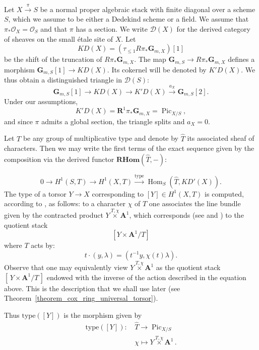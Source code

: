 \documentclass{proc-l}
\newcommand{\R}{\mathbf{R}}
\newcommand{\G}{\mathbf{G}}
\DeclareMathOperator{\Pic}{Pic}
\DeclareMathOperator{\Hom}{Hom}
\newcommand{\affine}{\mathbf{A}}
\newcommand{\sheafO}{\mathcal{O}}
\theoremstyle{definition}
\theoremstyle{remark}
\numberwithin{equation}{section}
\begin{document}
Let $X \xrightarrow{\pi} S$ be a normal proper algebraic stack with finite diagonal over a scheme $S$, which we assume to be either a Dedekind scheme or a field. We assume that $\pi_* \sheafO_X = \sheafO_S$ and that $\pi$ has a section. We write $\mathcal{D}(X)$ for the derived category of sheaves on the small étale site of $X$. Let
$$K D(X) = (\tau_{\leqslant 1} R \pi_* \G_{m,X} )[1]$$
be the shift of the truncation of $R\pi_* \G_{m,X}$. The map $\G_{m,S} \rightarrow R\pi_* \G_{m,X}$ defines a morphism $\G_{m,S}[1] \rightarrow K D(X)$. Its cokernel will be denoted by $K'D(X)$. We thus obtain a distinguished triangle in $\mathcal{D}(S)$:
$$\G_{m,S}[1] \rightarrow KD(X) \rightarrow K'D(X) \xrightarrow{a_X} \G_{m,S}[2].$$
Under our assumptions,
$$K'D(X) = \R^1 \pi_* \G_{m,X} = \Pic_{X/S},$$
and since $\pi$ admits a global section, the triangle splits and $a_X = 0$.


Let $T$ be any group of multiplicative type and denote by $\widehat{T}$ its associated sheaf of characters. Then we may write the first terms of the exact sequence given by the composition via the derived functor $\textbf{RHom}(\widehat{T},-) $:

$$0 \rightarrow H^1(S,T) \rightarrow H^1(X,T) \xrightarrow{\text{type}} \Hom_S(\widehat{T},KD'(X)) .$$The type of a torsor $Y \rightarrow X$ corresponding to $[Y] \in H^1(X,T)$ is computed, according to \cite[Lemma 2.3.1]{Skorobogatov2001}, as follows: to a character $\chi$ of $T$ one associates the line bundle given by the contracted product $Y \overset{T,\chi}{\times} \affine^1$, which corresponds (see \cite{giraud1971cohomologie} and \cite[Lemma 2.2.3]{Skorobogatov2001}) to the quotient stack
$$[ Y \times \affine^1 / T ]$$
where $T$ acts by:
\begin{equation}\label{equation_definition_contracted_product}
    t \cdot (y,\lambda) = (t^{-1} y ,\chi(t)\lambda).
\end{equation}
Observe that one may equivalently view $Y \overset{T,\chi}{\times} \affine^1$
as the quotient stack $[\, Y \times \affine^1 / T \,]$ endowed with the inverse
of the action described in the equation above. This is the description that we
shall use later (see Theorem~\ref{theorem_cox_ring_universal_torsor}).

Thus $\mathrm{type}([Y])$ is the morphism given by
\begin{align*}
    \mathrm{type}([Y]) : \, &\widehat{T} \rightarrow \Pic_{X/S} \\
    & \chi \longmapsto Y \overset{T,\chi}{\times} \affine^1 \, .
\end{align*}
\end{document}
